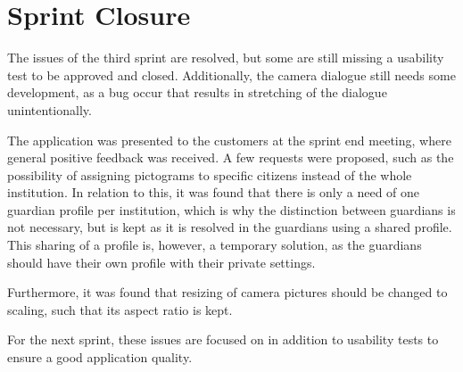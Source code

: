 \section{Sprint Closure}
The issues of the third sprint are resolved, but some are still missing a usability test to be approved and closed.
Additionally, the camera dialogue still needs some development, as a bug occur that results in stretching of the dialogue unintentionally.

The application was presented to the customers at the sprint end meeting, where general positive feedback was received.
A few requests were proposed, such as the possibility of assigning pictograms to specific citizens instead of the whole institution.
In relation to this, it was found that there is only a need of one guardian profile per institution, which is why the distinction between guardians is not necessary, but is kept as it is resolved in the guardians using a shared profile.
This sharing of a profile is, however, a temporary solution, as the guardians should have their own profile with their private settings.

Furthermore, it was found that resizing of camera pictures should be changed to scaling, such that its aspect ratio is kept.

For the next sprint, these issues are focused on in addition to usability tests to ensure a good application quality.